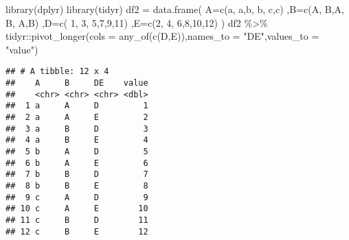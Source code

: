 \documentclass[
]{article}
\newenvironment{Shaded}{\begin{snugshade}}{\end{snugshade}}
\newcommand{\AttributeTok}[1]{\textcolor[rgb]{0.77,0.63,0.00}{#1}}
\newcommand{\DecValTok}[1]{\textcolor[rgb]{0.00,0.00,0.81}{#1}}
\newcommand{\FunctionTok}[1]{\textcolor[rgb]{0.00,0.00,0.00}{#1}}
\newcommand{\NormalTok}[1]{#1}
\newcommand{\OtherTok}[1]{\textcolor[rgb]{0.56,0.35,0.01}{#1}}
\newcommand{\SpecialCharTok}[1]{\textcolor[rgb]{0.00,0.00,0.00}{#1}}
\newcommand{\StringTok}[1]{\textcolor[rgb]{0.31,0.60,0.02}{#1}}
\begin{document}
\begin{Shaded}
\begin{Highlighting}[]
\FunctionTok{library}\NormalTok{(dplyr)}
\FunctionTok{library}\NormalTok{(tidyr)}
\NormalTok{df2 }\OtherTok{=} \FunctionTok{data.frame}\NormalTok{(}
  \AttributeTok{A=}\FunctionTok{c}\NormalTok{(}\StringTok{\textquotesingle{}a\textquotesingle{}}\NormalTok{, }\StringTok{\textquotesingle{}a\textquotesingle{}}\NormalTok{,}\StringTok{\textquotesingle{}b\textquotesingle{}}\NormalTok{, }\StringTok{\textquotesingle{}b\textquotesingle{}}\NormalTok{, }\StringTok{\textquotesingle{}c\textquotesingle{}}\NormalTok{,}\StringTok{\textquotesingle{}c\textquotesingle{}}\NormalTok{)}
\NormalTok{  ,}\AttributeTok{B=}\FunctionTok{c}\NormalTok{(}\StringTok{\textquotesingle{}A\textquotesingle{}}\NormalTok{, }\StringTok{\textquotesingle{}B\textquotesingle{}}\NormalTok{,}\StringTok{\textquotesingle{}A\textquotesingle{}}\NormalTok{, }\StringTok{\textquotesingle{}B\textquotesingle{}}\NormalTok{, }\StringTok{\textquotesingle{}A\textquotesingle{}}\NormalTok{,}\StringTok{\textquotesingle{}B\textquotesingle{}}\NormalTok{)}
\NormalTok{  ,}\AttributeTok{D=}\FunctionTok{c}\NormalTok{( }\DecValTok{1}\NormalTok{, }\DecValTok{3}\NormalTok{, }\DecValTok{5}\NormalTok{,}\DecValTok{7}\NormalTok{,}\DecValTok{9}\NormalTok{,}\DecValTok{11}\NormalTok{)}
\NormalTok{  ,}\AttributeTok{E=}\FunctionTok{c}\NormalTok{(}\DecValTok{2}\NormalTok{, }\DecValTok{4}\NormalTok{, }\DecValTok{6}\NormalTok{,}\DecValTok{8}\NormalTok{,}\DecValTok{10}\NormalTok{,}\DecValTok{12}\NormalTok{)}
\NormalTok{  )}
\NormalTok{df2 }\SpecialCharTok{\%\textgreater{}\%}
\NormalTok{  tidyr}\SpecialCharTok{::}\FunctionTok{pivot\_longer}\NormalTok{(}\AttributeTok{cols =} \FunctionTok{any\_of}\NormalTok{(}\FunctionTok{c}\NormalTok{(}\StringTok{\textquotesingle{}D\textquotesingle{}}\NormalTok{,}\StringTok{\textquotesingle{}E\textquotesingle{}}\NormalTok{)),}\AttributeTok{names\_to =} \StringTok{"DE"}\NormalTok{,}\AttributeTok{values\_to  =} \StringTok{"value"}\NormalTok{)}
\end{Highlighting}
\end{Shaded}

\begin{verbatim}
## # A tibble: 12 x 4
##    A     B     DE    value
##    <chr> <chr> <chr> <dbl>
##  1 a     A     D         1
##  2 a     A     E         2
##  3 a     B     D         3
##  4 a     B     E         4
##  5 b     A     D         5
##  6 b     A     E         6
##  7 b     B     D         7
##  8 b     B     E         8
##  9 c     A     D         9
## 10 c     A     E        10
## 11 c     B     D        11
## 12 c     B     E        12
\end{verbatim}
\end{document}
